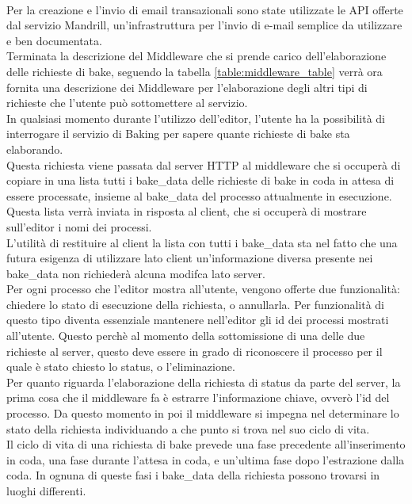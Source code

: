\\
Per la creazione e l’invio di email transazionali sono state utilizzate le API offerte dal servizio Mandrill, un’infrastruttura per l’invio di e-mail semplice da utilizzare e ben documentata.
\\
Terminata la descrizione del Middleware che si prende carico dell'elaborazione delle richieste di bake, seguendo la tabella \ref{table:middleware_table} verrà ora fornita una descrizione dei Middleware per l'elaborazione degli altri tipi di richieste che l'utente può sottomettere al servizio.
\\ 
In qualsiasi momento durante l’utilizzo dell’editor, l’utente ha la possibilità di interrogare il servizio di Baking per sapere quante richieste di bake sta elaborando. 
\\
Questa richiesta viene passata dal server HTTP al middleware che si occuperà di copiare in una lista tutti i bake\_data delle richieste di bake in coda in attesa di essere processate, insieme al bake\_data del processo attualmente in esecuzione. 
Questa lista verrà inviata in risposta al client, che si occuperà di mostrare sull’editor i nomi dei processi.
\\
L’utilità di restituire al client la lista con tutti i bake\_data sta nel fatto che una futura esigenza di utilizzare lato client un’informazione diversa presente nei bake\_data non richiederà alcuna modifca lato server. 
\\
Per ogni processo che l’editor mostra all’utente, vengono offerte due funzionalità: chiedere lo stato di esecuzione della richiesta, o annullarla. Per funzionalità di questo tipo diventa essenziale mantenere nell’editor gli id dei processi mostrati all’utente.
Questo perchè al momento della sottomissione di una delle due richieste al server, questo deve essere in grado di riconoscere il processo per il quale è stato chiesto lo status, o l’eliminazione. 
\\
Per quanto riguarda l’elaborazione della richiesta di status da parte del server, la prima cosa che il middleware fa è estrarre l’informazione chiave, ovverò l’id del processo. Da questo momento in poi il middleware si impegna nel determinare lo stato della richiesta individuando a che punto si trova nel suo ciclo di vita. 
\\
Il ciclo di vita di una richiesta di bake prevede una fase precedente all’inserimento in coda, una fase durante l’attesa in coda, e un’ultima fase dopo l’estrazione dalla coda. In ognuna di queste fasi i bake\_data della richiesta possono trovarsi in luoghi differenti. 
